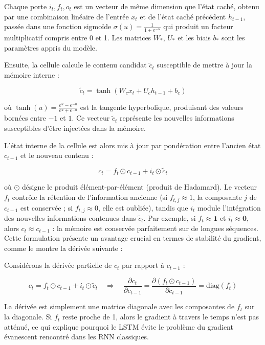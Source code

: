 Chaque porte $i_t, f_t, o_t$ est un vecteur de même dimension que l’état caché, obtenu par une combinaison linéaire de l’entrée $x_t$ et de l’état caché précédent $h_{t-1}$, passée dans une fonction sigmoïde $\sigma(u) = \frac{1}{1 + e^{-u}}$ qui produit un facteur multiplicatif compris entre 0 et 1. Les matrices $W_*$, $U_*$ et les biais $b_*$ sont les paramètres appris du modèle.

Ensuite, la cellule calcule le contenu candidat $\tilde{c}_t$ susceptible de mettre à jour la mémoire interne :

\begin{equation}
\tilde{c}_t = \tanh\left(W_c x_t + U_c h_{t-1} + b_c\right) 
\end{equation}

où $\tanh(u) = \frac{e^u - e^{-u}}{e^u + e^{-u}}$ est la tangente hyperbolique, produisant des valeurs bornées entre $-1$ et $1$. Ce vecteur $\tilde{c}_t$ représente les nouvelles informations susceptibles d’être injectées dans la mémoire.

L’état interne de la cellule est alors mis à jour par pondération entre l’ancien état $c_{t-1}$ et le nouveau contenu :

\begin{equation}
c_t = f_t \odot c_{t-1} + i_t \odot \tilde{c}_t 
\end{equation}

où $\odot$ désigne le produit élément-par-élément (produit de Hadamard). Le vecteur $f_t$ contrôle la rétention de l’information ancienne (si $f_{t,j} \approx 1$, la composante $j$ de $c_{t-1}$ est conservée ; si $f_{t,j} \approx 0$, elle est oubliée), tandis que $i_t$ module l’intégration des nouvelles informations contenues dans $\tilde{c}_t$. Par exemple, si $f_t \approx \mathbf{1}$ et $i_t \approx \mathbf{0}$, alors $c_t \approx c_{t-1}$ : la mémoire est conservée parfaitement sur de longues séquences. Cette formulation présente un avantage crucial en termes de stabilité du gradient, comme le montre la dérivée suivante :


\begin{demonstration}
Considérons la dérivée partielle de $c_t$ par rapport à $c_{t-1}$ :

\[
c_t = f_t \odot c_{t-1} + i_t \odot \tilde{c}_t \quad \Rightarrow \quad
\frac{\partial c_t}{\partial c_{t-1}} = \frac{\partial (f_t \odot c_{t-1})}{\partial c_{t-1}} = \text{diag}(f_t)
\]

La dérivée est simplement une matrice diagonale avec les composantes de $f_t$ sur la diagonale. Si $f_t$ reste proche de 1, alors le gradient à travers le temps n’est pas atténué, ce qui explique pourquoi le LSTM évite le problème du gradient évanescent rencontré dans les RNN classiques.
\end{demonstration}


